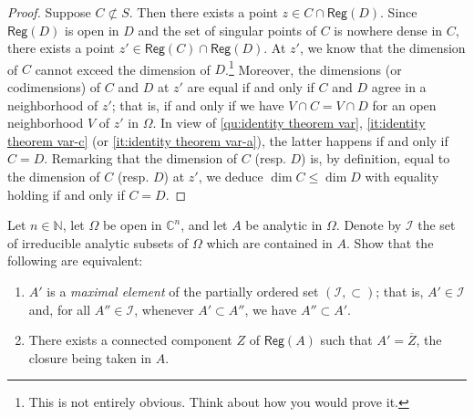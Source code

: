 \documentclass[a4paper]{amsart}
\newcommand{\N}{\mathbb{N}}
\newcommand{\C}{\mathbb{C}}
\newcommand{\Reg}[1]{\mathsf{Reg}(#1)}
\theoremstyle{remark}
\numberwithin{equation}{question}
\begin{document}
\begin{solution}
\begin{solenum}
\begin{proof}
Suppose $C \not\subset S$. Then there exists a point $z \in C \cap \Reg D$. Since $\Reg D$ is open in $D$ and the set of singular points of $C$ is nowhere dense in $C$, there exists a point $z' \in \Reg C \cap \Reg D$. At $z'$, we know that the dimension of $C$ cannot exceed the dimension of $D$.\footnote{This is not entirely obvious. Think about how you would prove it.} Moreover, the dimensions (or codimensions) of $C$ and $D$ at $z'$ are equal if and only if $C$ and $D$ agree in a neighborhood of $z'$; that is, if and only if we have $V \cap C = V \cap D$ for an open neighborhood $V$ of $z'$ in $\Omega$. In view of \cref{qu:identity theorem var}, \cref{it:identity theorem var-c} (or \cref{it:identity theorem var-a}), the latter happens if and only if $C = D$. Remarking that the dimension of $C$ (resp. $D$) is, by definition, equal to the dimension of $C$ (resp. $D$) at $z'$, we deduce $\dim C \le \dim D$ with equality holding if and only if $C = D$.
\end{proof}
\end{solenum}
\end{solution}

\begin{question}[name=Exercise*, subtitle=A characterization of irreducible components]
\label{qu:irred comp char}
Let $n \in \N$, let $\Omega$ be open in $\C^n$, and let $A$ be analytic in $\Omega$. Denote by $\mathcal I$ the set of irreducible analytic subsets of $\Omega$ which are contained in $A$. Show that the following are equivalent:
\begin{enumerate}[label=\emph{\roman*}.]
\item \label{it:irred comp char-1} $A'$ is a \emph{maximal element} of the partially ordered set $(\mathcal I,{\subset})$; that is, $A' \in \mathcal I$ and, for all $A'' \in \mathcal I$, whenever $A' \subset A''$, we have $A'' \subset A'$.
\item \label{it:irred comp char-2} There exists a connected component $Z$ of $\Reg A$ such that $A' = \overline Z$, the closure being taken in $A$.
\end{enumerate}
\end{question}
\end{document}
